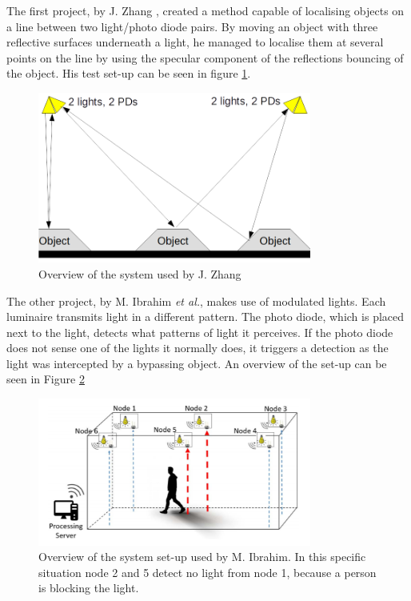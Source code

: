The first project, by J. Zhang \cite{JakesWork}, created a method capable of localising objects on a line between two light/photo diode pairs. By moving an object with three reflective surfaces underneath a light, he managed to localise them at several points on the line by using the specular component of the reflections bouncing of the object. His test set-up can be seen in figure \ref{Zhangpicca}.
\begin{figure}[]
	\centering
	\includegraphics[width=90mm]{pics/Pic_Jake.png}
	\caption{Overview of the system used by J. Zhang \cite{JakesWork}\label{Zhangpicca}}
\end{figure}

The other project, by M. Ibrahim \textit{et al.}, makes use of modulated lights. Each luminaire transmits light in a different pattern. The photo diode, which is placed next to the light, detects what patterns of light it perceives. If the photo diode does not sense one of the lights it normally does, it triggers a detection as the light was intercepted by a bypassing object. An overview of the set-up can be seen in Figure \ref{fig:Ceiling_PD}

\begin{figure}[]
	\centering
	\includegraphics[width=90mm]{pics/lightspdceiling.png}
	\caption{Overview of the system set-up used by M. Ibrahim\cite{Ceiling_PD}. In this specific situation node 2 and 5 detect no light from node 1, because a person is blocking the light.\label{fig:Ceiling_PD}}
\end{figure}

